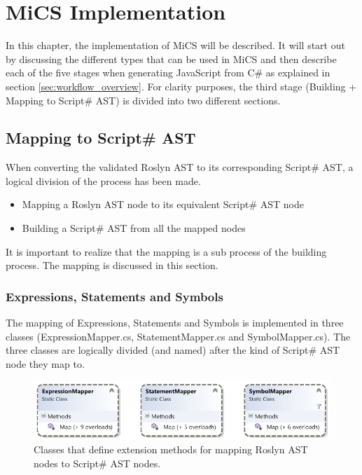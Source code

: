 \chapter{MiCS Implementation}
	In this chapter, the implementation of MiCS will be described. It will start out by discussing the different types that can be used in MiCS and then describe each of the five stages when generating JavaScript from C\# as explained in section \ref{sec:workflow_overview}. For clarity purposes, the third stage (Building + Mapping to Script\# AST) is divided into two different sections.






\section{Mapping to Script\# AST} %
\label{sec:mapping_to_scriptsharp_ast}
	When converting the validated Roslyn AST to its corresponding Script\# AST, a logical division of the process has been made. 

	\begin{itemize}
		\item Mapping a Roslyn AST node to its equivalent Script\# AST node
		\item Building a Script\# AST from all the mapped nodes
	\end{itemize}

	It is important to realize that the mapping is a sub process of the building process. The mapping is discussed in this section. 

	\subsection{Expressions, Statements and Symbols} %
	\label{sub:subsection_mapping_to_scriptsharp_expressions_statements_and_symbols}
		The mapping of Expressions, Statements and Symbols is implemented in three classes (ExpressionMapper.cs, StatementMapper.cs and SymbolMapper.cs). The three classes are logically divided (and named) after the kind of Script\# AST node they map to. 

		\begin{figure}[H]
			\begin{center}
				\centerline{\includegraphics[width=14cm]{resources/images/MapperClasses.png}}
			\end{center}
			\caption{Classes that define extension methods for mapping Roslyn AST nodes to Script\# AST nodes.}
			\label{mapperClasses}
		\end{figure}


